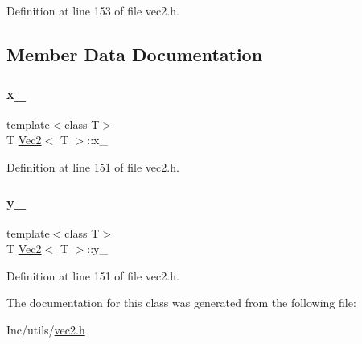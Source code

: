 Definition at line 153 of file vec2.\+h.



\subsection{Member Data Documentation}
\mbox{\label{class_vec2_a5133b04922466dbdfa2eee874774d87c}} 
\subsubsection{\texorpdfstring{x\_}{x\_}}
{\footnotesize\ttfamily template$<$class T$>$ \\
T \mbox{\hyperlink{class_vec2}{Vec2}}$<$ T $>$\+::x\+\_\+\hspace{0.3cm}{\ttfamily [private]}}



Definition at line 151 of file vec2.\+h.

\mbox{\label{class_vec2_a2e3f3c5cb29e351179b0f2755879aaf8}} 
\subsubsection{\texorpdfstring{y\_}{y\_}}
{\footnotesize\ttfamily template$<$class T$>$ \\
T \mbox{\hyperlink{class_vec2}{Vec2}}$<$ T $>$\+::y\+\_\+\hspace{0.3cm}{\ttfamily [private]}}



Definition at line 151 of file vec2.\+h.



The documentation for this class was generated from the following file\+:\begin{DoxyCompactItemize}
\item 
Inc/utils/\mbox{\hyperlink{vec2_8h}{vec2.\+h}}\end{DoxyCompactItemize}
